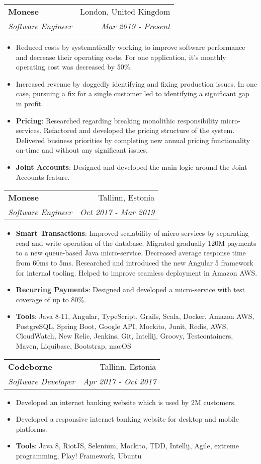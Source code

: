 \documentclass[letterpaper,11pt]{article}
\makeatletter
\newcommand{\resumeItem}[2]{
  \item\small{
    \textbf{#1}{: #2 \vspace{-2pt}}
  }
}
\newcommand{\resumeItemWithoutTitle}[2]{
  \item\small{
    \textbf{#1}{#2\vspace{-2pt}}
  }
}
\newcommand{\resumeSubheading}[4]{
  \vspace{-1pt}\item
    \begin{tabular*}{0.97\textwidth}[t]{l@{\extracolsep{\fill}}r}
      \textbf{#1} & #2 \\
      \textit{\small#3} & \textit{\small #4} \\
    \end{tabular*}\vspace{-5pt}
}
\newcommand{\resumeSubSubheading}[2]{
    \begin{tabular*}{0.97\textwidth}{l@{\extracolsep{\fill}}r}
      \textit{\small#1} & \textit{\small #2} \\
    \end{tabular*}\vspace{-5pt}
}
\newcommand{\resumeItemListStart}{\begin{itemize}}
\newcommand{\resumeItemListEnd}{\end{itemize}\vspace{-5pt}}
\makeatother
\begin{document}
    \resumeSubheading
      {Monese}{London, United Kingdom}
      {Software Engineer}{Mar 2019 - Present}
      \resumeItemListStart
        \resumeItemWithoutTitle{}
        {Reduced costs by systematically working to improve software performance and decrease their 
        operating costs. For one application, it’s monthly operating cost was decreased by 50\%.}
        \resumeItemWithoutTitle{}
        {Increased revenue by doggedly identifying and fixing production issues. In one case, 
        pursuing a fix for a single customer led to identifying a significant gap in profit.}
        \resumeItem{Pricing}
        {Researched regarding breaking monolithic responsibility micro-services. Refactored and 
        developed the pricing structure of the system. Delivered business priorities by completing 
        new annual pricing functionality on-time and without any significant issues.}
        \resumeItem{Joint Accounts}
        {Designed and developed the main logic around the Joint Accounts feature.}
      \resumeItemListEnd

  \resumeSubheading
  {Monese}{Tallinn, Estonia}
  {Software Engineer}{Oct 2017 - Mar 2019}
  \resumeItemListStart
    \resumeItem{Smart Transactions}
      {Improved scalability of micro-services by separating read and write operation of the database. 
      Migrated gradually 120M payments to a new queue-based Java micro-service. Decreased average response
      time from 60ms to 5ms. Researched and introduced the new Angular 5 framework for internal tooling. 
      Helped to improve seamless deployment in Amazon AWS.}
    \resumeItem{Recurring Payments}
      {Designed and developed a micro-service with test coverage of up to 80\%.}
    \resumeItem{Tools}
      {Java 8-11, Angular, TypeScript, Grails, Scala, Docker, Amazon AWS, PostgreSQL, Spring Boot, 
      Google API, Mockito, Junit, Redis, AWS, CloudWatch, New Relic, Jenkins, Git, Intellij, Groovy, 
      Testcontainers, Maven, Liquibase, Bootstrap, macOS}
  \resumeItemListEnd
    \resumeSubheading
      {Codeborne}{Tallinn, Estonia}
      {Software Developer}{Apr 2017 - Oct 2017}
      \resumeItemListStart
        \resumeItemWithoutTitle{}
          {Developed an internet banking website which is used by 2M customers.}
        \resumeItemWithoutTitle{}
          {Developed a responsive internet banking website for desktop and mobile platforms.}
        \resumeItem{Tools}
        {Java 8, RiotJS, Selenium, Mockito, TDD, Intellij, Agile, extreme programming, Play! Framework, 
        Ubuntu}
      \resumeItemListEnd
\end{document}
